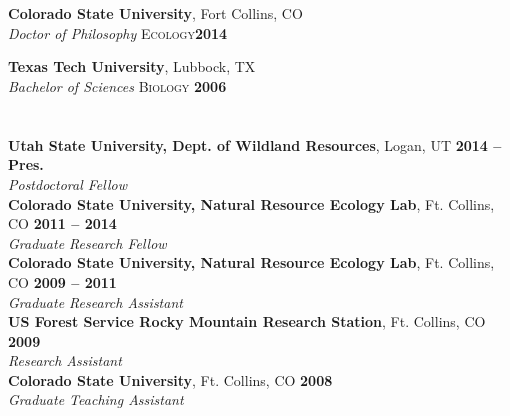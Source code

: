 \documentclass[margin,line]{resume}
\begin{document}
\begin{resume}
    \section{\textmd{\textsf{\color{MidnightBlue}{Education}}}}

    \textbf{Colorado State University}, Fort Collins, CO \vspace{1mm}\\\vspace{1mm}%
    \textsl{Doctor of Philosophy} \textsc{Ecology}\hfill \textbf{2014}\vspace{-3mm}\\\vspace{-1mm}%
    
    \textbf{Texas Tech University}, Lubbock, TX \vspace{1mm}\\\vspace{1mm}%
    \textsl{Bachelor of Sciences} \textsc{Biology} \hfill \textbf{2006}\vspace{-3mm}\\\vspace{-1mm}%
    
    \section{\textmd{\textsf{\color{MidnightBlue}{Professional\\Appointments}}}}
    \textbf{Utah State University, Dept. of Wildland Resources}, Logan, UT \hfill \textbf{2014 -- Pres.} \\
		\textsl{Postdoctoral Fellow} \vspace{.5mm}\\
    \textbf{Colorado State University, Natural Resource Ecology Lab}, Ft. Collins, CO \hfill \textbf{2011 -- 2014}\\
		\textsl{Graduate Research Fellow}\vspace{.5mm}\\ 
    \textbf{Colorado State University, Natural Resource Ecology Lab}, Ft. Collins, CO \hfill \textbf{2009 -- 2011}\\
		\textsl{Graduate Research Assistant}\vspace{.5mm}\\ 
     \textbf{US Forest Service Rocky Mountain Research Station}, Ft. Collins, CO \hfill \textbf{2009}\\
		\textsl{Research Assistant}\vspace{.5mm}\\ 		
     \textbf{Colorado State University}, Ft. Collins, CO \hfill \textbf{2008}\\
		\textsl{Graduate Teaching Assistant}\\ 


\end{resume}
\end{document}
